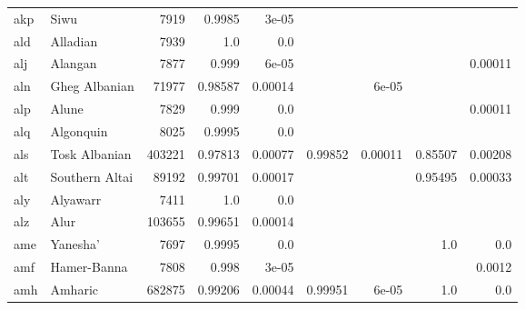 \documentclass[11pt]{article}
\begin{document}
\begin{table*}[ht]
{\begin{tabular}{llrrrrrrr}
akp         & Siwu         & 7919         & 0.9985         & 3e-05         &          &          &          &          \\

ald         & Alladian         & 7939         & 1.0         & 0.0         &          &          &          &          \\

alj         & Alangan         & 7877         & 0.999         & 6e-05         &          &          &          & 0.00011         \\

aln         & Gheg Albanian         & 71977         & 0.98587         & 0.00014         &          & 6e-05         &          &          \\

alp         & Alune         & 7829         & 0.999         & 0.0         &          &          &          & 0.00011         \\

alq         & Algonquin         & 8025         & 0.9995         & 0.0         &          &          &          &          \\

als         & Tosk Albanian         & 403221         & 0.97813         & 0.00077         & 0.99852         & 0.00011         & 0.85507         & 0.00208         \\

alt         & Southern Altai         & 89192         & 0.99701         & 0.00017         &          &          & 0.95495         & 0.00033         \\

aly         & Alyawarr         & 7411         & 1.0         & 0.0         &          &          &          &          \\

alz         & Alur         & 103655         & 0.99651         & 0.00014         &          &          &          &          \\

ame         & Yanesha'         & 7697         & 0.9995         & 0.0         &          &          & 1.0         & 0.0         \\

amf         & Hamer-Banna         & 7808         & 0.998         & 3e-05         &          &          &          & 0.0012         \\

amh         & Amharic         & 682875         & 0.99206         & 0.00044         & 0.99951         & 6e-05         & 1.0         & 0.0         \\


\end{tabular}}
\end{table*}
\end{document}
